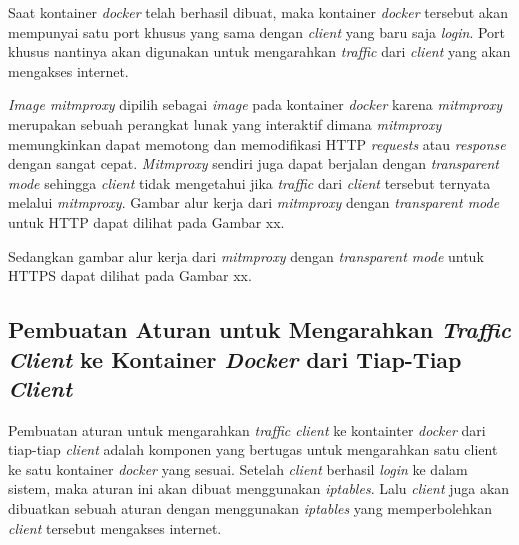 	Saat kontainer \textit{docker} telah berhasil dibuat, maka kontainer \textit{docker} tersebut akan mempunyai satu port khusus yang sama dengan \textit{client} yang baru saja \textit{login}. Port khusus nantinya akan digunakan untuk mengarahkan \textit{traffic} dari \textit{client} yang akan mengakses internet.
	
	\textit{Image mitmproxy} dipilih sebagai \textit{image} pada kontainer \textit{docker} karena \textit{mitmproxy} merupakan sebuah perangkat lunak yang interaktif dimana \textit{mitmproxy} memungkinkan dapat memotong dan memodifikasi HTTP \textit{requests} atau \textit{response} dengan sangat cepat. \textit{Mitmproxy} sendiri juga dapat berjalan dengan \textit{transparent mode} sehingga \textit{client} tidak mengetahui jika \textit{traffic} dari \textit{client} tersebut ternyata melalui \textit{mitmproxy}. Gambar alur kerja dari \textit{mitmproxy} dengan \textit{transparent mode} untuk HTTP dapat dilihat pada Gambar xx.
	
	Sedangkan gambar alur kerja dari \textit{mitmproxy} dengan \textit{transparent mode} untuk HTTPS dapat dilihat pada Gambar xx.

   	\subsection{Pembuatan Aturan untuk Mengarahkan \textit{Traffic Client} ke Kontainer \textit{Docker} dari Tiap-Tiap \textit{Client}}
   	Pembuatan aturan untuk mengarahkan \textit{traffic client} ke kontainter \textit{docker} dari tiap-tiap \textit{client} adalah komponen yang bertugas untuk mengarahkan satu client ke satu kontainer \textit{docker} yang sesuai. Setelah \textit{client} berhasil \textit{login} ke dalam sistem, maka aturan ini akan dibuat menggunakan \textit{iptables}. Lalu \textit{client} juga akan dibuatkan sebuah aturan dengan menggunakan \textit{iptables} yang memperbolehkan \textit{client} tersebut mengakses internet.